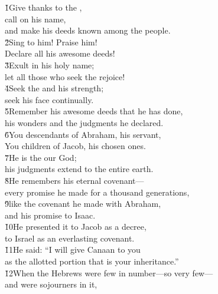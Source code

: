 
\begin{poetry}
\poeml \v{1}Give thanks to the , \\
\poemll    call on his name, \\
\poemlll       and make his deeds known among the people. \\
\poeml \v{2}Sing to him! Praise him! \\
\poemll    Declare all his awesome deeds! \\
\poeml \v{3}Exult in his holy name; \\
\poemll    let all those who seek the  rejoice! \\
\poeml \v{4}Seek the  and his strength; \\
\poemll    seek his face continually. \\
\poeml \v{5}Remember his awesome deeds that he has done, \\
\poemll    his wonders and the judgments he declared. \\
\poeml \v{6}You descendants of Abraham, his servant, \\
\poemll    You children of Jacob, his chosen ones. \\
\poeml \v{7}He is the  our God; \\
\poemll    his judgments extend to the entire earth. \\
\poeml \v{8}He remembers his eternal covenant--- \\
\poemll    every promise he made for a thousand generations, \\
\poeml \v{9}like the covenant he made with Abraham, \\
\poemll    and his promise to Isaac. \\
\poeml \v{10}He presented it to Jacob as a decree, \\
\poemll    to Israel as an everlasting covenant. \\
\poeml \v{11}He said: ``I will give Canaan to you \\
\poemll    as the allotted portion that is your inheritance.'' \\
\poeml \v{12}When the Hebrews were few in number---so very few--- \\
\poemll    and were sojourners in it, \\

\end{poetry}
